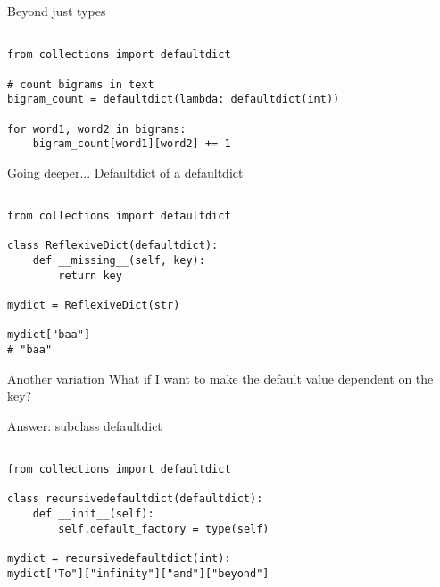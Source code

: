 \documentclass{beamer}
\begin{document}
\begin{frame}{Beyond just types}
 
\vspace{-1em}
{\usebox{\mysavebox}}

\vspace{1em}
\end{frame}

\begin{lrbox}{\mysavebox}
\begin{lstlisting}

from collections import defaultdict

# count bigrams in text
bigram_count = defaultdict(lambda: defaultdict(int))

for word1, word2 in bigrams:
	bigram_count[word1][word2] += 1

\end{lstlisting}
\end{lrbox}

\begin{frame}{Going deeper...}
 Defaultdict of a defaultdict

\vspace{1.5em}
{\usebox{\mysavebox}}
   
\end{frame}

\begin{lrbox}{\mysavebox}
\begin{lstlisting}

from collections import defaultdict

class ReflexiveDict(defaultdict):
    def __missing__(self, key):
        return key

mydict = ReflexiveDict(str)

mydict["baa"]
# "baa"

\end{lstlisting}
\end{lrbox}

\begin{frame}{Another variation}
 What if I want to make the default value dependent on the key?

 \bigskip

 Answer: subclass defaultdict
 
\vspace{1em}
{\usebox{\mysavebox}}
    
\end{frame}

\begin{lrbox}{\mysavebox}
\begin{lstlisting}

from collections import defaultdict

class recursivedefaultdict(defaultdict):
    def __init__(self):
        self.default_factory = type(self)

mydict = recursivedefaultdict(int):
mydict["To"]["infinity"]["and"]["beyond"]

\end{lstlisting}
\end{lrbox}
\end{document}

